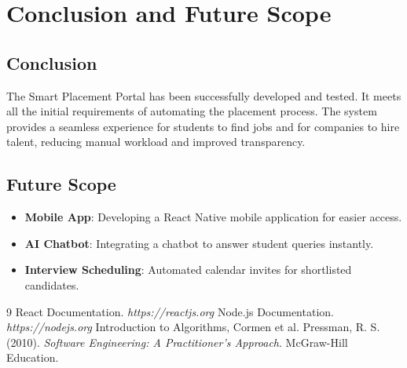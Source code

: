 \documentclass[12pt, a4paper]{report}
\begin{document}
\chapter{Conclusion and Future Scope}

\section{Conclusion}
The Smart Placement Portal has been successfully developed and tested. It meets all the initial requirements of automating the placement process. The system provides a seamless experience for students to find jobs and for companies to hire talent, reducing manual workload and improved transparency.

\section{Future Scope}
\begin{itemize}
    \item \textbf{Mobile App}: Developing a React Native mobile application for easier access.
    \item \textbf{AI Chatbot}: Integrating a chatbot to answer student queries instantly.
    \item \textbf{Interview Scheduling}: Automated calendar invites for shortlisted candidates.
\end{itemize}

\begin{thebibliography}{9}
 React Documentation. \textit{https://reactjs.org}
 Node.js Documentation. \textit{https://nodejs.org}
 Introduction to Algorithms, Cormen et al.
 Pressman, R. S. (2010). \textit{Software Engineering: A Practitioner's Approach}. McGraw-Hill Education.
\end{thebibliography}
\end{document}
